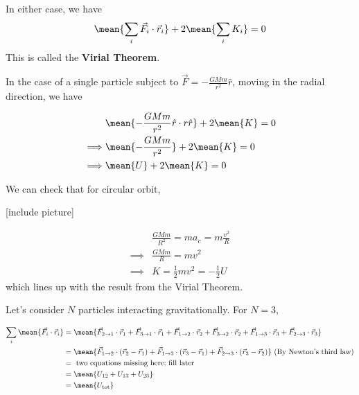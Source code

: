 \documentclass[11pt]{article}
\begin{document}
\begin{bluebox} 
  In either case, we have 
  \begin{align*}
    \mean{\sum_i \vec{F}_i \cdot \vec{r}_i} + 2 \mean{\sum_i K_i} = 0
  \end{align*}
  This is called the \textbf{Virial Theorem}.
\end{bluebox}

\vskip 0.5cm
In the case of a single particle subject to $\vec{F} = - \frac{GMm}{r^2}\hat{r}$, moving in the radial direction, we have 

\begin{align*}
  &\mean{-\frac{GMm}{r^2} \hat{r} \cdot r \hat{r}} + 2 \mean{K} = 0 \\
  \implies& \mean{-\frac{GMm}{r^2}} + 2\mean{K} = 0\\
  \implies& \mean{U} + 2\mean{K} = 0
\end{align*}

We can check that for circular orbit, 

\vskip 0.5cm
[include picture]
\vskip 0.5cm


\begin{align*}
  &\frac{GMm}{R^2} = ma_c = m\frac{v^2}{R} \\
  \implies& \frac{GMm}{R} = mv^2 \\
  \implies& K = \frac{1}{2} mv^2 = -\frac{1}{2} U
\end{align*}
which lines up with the result from the Virial Theorem.

\vskip 0.5cm
Let's consider $N$ particles interacting gravitationally. For $N = 3$,

\begin{align*}
  \sum_i \mean{ \vec{F}_i \cdot \vec{r}_i } &= \mean{ \vec{F}_{2 \rightarrow 1} \cdot \vec{r}_1 + \vec{F}_{3 \rightarrow 1} \cdot \vec{r}_1 + \vec{F}_{1 \rightarrow 2} \cdot \vec{r}_2 + \vec{F}_{3 \rightarrow 2} \cdot \vec{r}_2 + \vec{F}_{1 \rightarrow 3} \cdot \vec{r}_3 + \vec{F}_{2 \rightarrow 3} \cdot \vec{r}_3 } \\
  &= \mean{ \vec{F}_{1 \rightarrow 2} \cdot \left( \vec{r}_2 - \vec{r}_1 \right) + \vec{F}_{1 \rightarrow 3} \cdot \left( \vec{r}_3 - \vec{r}_1 \right) + \vec{F}_{2 \rightarrow 3} \cdot \left( \vec{r}_3 - \vec{r}_2 \right) } \text{ (By Newton's third law)} \\
  &= \text{ two equations missing here; fill later }\\
  &= \mean{ U_{12} + U_{13} + U_{23} } \\
  &= \mean{ U_{\text{tot}}}
\end{align*} 
\end{document}
